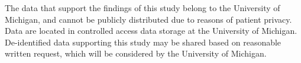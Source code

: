 The data that support the findings of this study belong to the University of Michigan, and cannot be publicly distributed due to reasons of patient privacy. Data are located in controlled access data storage at the University of Michigan. De-identified data supporting this study may be shared based on reasonable written request, which will be considered by the University of Michigan.
